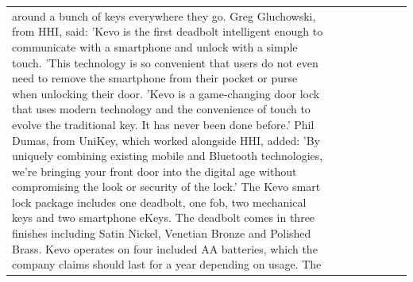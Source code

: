 \begin{table}[H]
\begin{tabular}{llrlllll}
around a bunch of keys everywhere they go. Greg Gluchowski, from HHI, said: 'Kevo is the first deadbolt intelligent enough to communicate with a smartphone and unlock with a simple touch. 'This technology is so convenient that users do not even need to remove the smartphone from their pocket or purse when unlocking their door. 'Kevo is a game-changing door lock that uses modern technology and the convenience of touch to evolve the traditional key. It has never been done before.' Phil Dumas, from UniKey, which worked alongside HHI, added: 'By uniquely combining existing mobile and Bluetooth technologies, we’re bringing your front door into the digital age without compromising the look or security of the lock.' The Kevo smart lock package includes one deadbolt, one fob, two mechanical keys and two smartphone eKeys. The deadbolt comes in three finishes including Satin Nickel, Venetian Bronze and Polished Brass. Kevo operates on four included AA batteries, which the company claims should last for a year depending on usage. The \\

\end{tabular}
\end{table}

